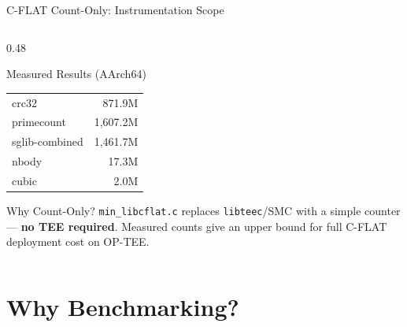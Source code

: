 \documentclass[aspectratio=169, 10pt]{beamer}
\begin{document}
\begin{frame}{C-FLAT Count-Only: Instrumentation Scope}
\begin{columns}[T]
\begin{column}{0.48\textwidth}
\begin{greenbox}{Measured Results (AArch64)}
\begin{tabular}{lr}
                    crc32          & 871.9M \\
                    primecount     & 1,607.2M \\
                    sglib-combined & 1,461.7M \\
                    nbody          &    17.3M \\
                    cubic          &     2.0M \\
                \end{tabular}
            \end{greenbox}
            \vspace{4pt}
            \begin{defbox}{Why Count-Only?}
                \scriptsize \texttt{min\_libcflat.c} replaces \texttt{libteec}/SMC
                with a simple counter --- \textbf{no TEE required}.
                Measured counts give an upper bound for full C-FLAT
                deployment cost on OP-TEE.
            \end{defbox}
        \end{column}
    \end{columns}
\end{frame}

\section{Why Benchmarking?}
\end{document}
